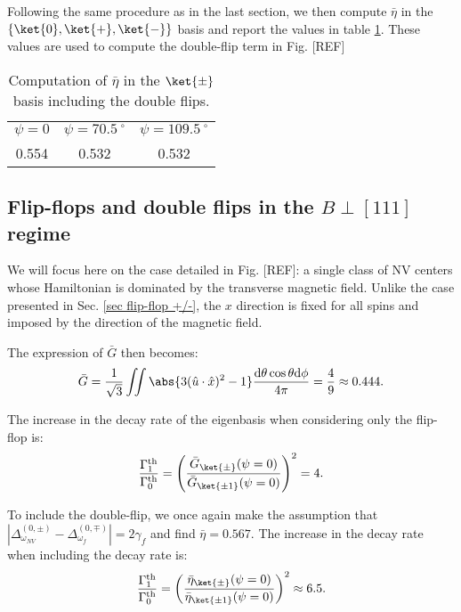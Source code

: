\documentclass[a4paper,11pt]{report}
\begin{document}
Following the same procedure as in the last section, we then compute $\bar \eta$ in the $\{ \ket{0}, \ket{+}, \ket{-}\}$ basis and report the values in table \ref{table eta double flip non mag}. These values are used to compute the double-flip term in Fig. [REF]

\begin{table}[htbp]
\centering
\caption{Computation of $\bar \eta$ in the $\ket{\pm}$ basis including the double flips.}
 \label{table eta double flip non mag}
\begin{tabular}{c|c|c}
\toprule
$\psi=0$ & $\psi=70.5 \ ^\circ$ & $\psi=109.5 \ ^\circ$ \\

0.554 & 0.532 & 0.532 \\
\bottomrule
\end{tabular}
\end{table}

\subsection{Flip-flops and double flips in the $B\perp [111]$ regime}

We will focus here on the case detailed in Fig. [REF]: a single class of NV centers whose Hamiltonian is dominated by the transverse magnetic field. Unlike the case presented in Sec. \ref{sec flip-flop +/-}, the $x$ direction is fixed for all spins and imposed by the direction of the magnetic field.

The expression of $\bar G$ then becomes:
\begin{equation}
\bar{G}= \frac{1}{\sqrt{3}}\iint \abs{3(\hat{u}\cdot\hat{x})^2 - 1} \frac{\rm d\theta \cos \theta \rm d\phi}{4 \pi}= \frac{4}{9}\approx 0.444.
\end{equation}

The increase in the decay rate of the eigenbasis when considering only the flip-flop is:
\begin{equation}
\frac{\Gamma_1^{\rm th}}{\Gamma_0^{\rm th}}=\left(\frac{\bar G_{\ket{\pm}}(\psi=0)}{\bar G_{\ket{\pm 1}}(\psi=0)}\right)^2=4.
\end{equation}

To include the double-flip, we once again make the assumption that $|\Delta_{\omega_{NV}}^{(0,\pm)}-\Delta_{\omega_{f}}^{(0,\mp)}|=2 \gamma_f$ and find $\bar \eta=0.567$. The increase in the decay rate when including the decay rate is:
\begin{equation}
\frac{\Gamma_1^{\rm th}}{\Gamma_0^{\rm th}}=\left(\frac{\bar \eta_{\ket{\pm}}(\psi=0)}{\bar \eta_{\ket{\pm 1}}(\psi=0)}\right)^2\approx 6.5.
\end{equation}
\printbibliography
\end{document}
